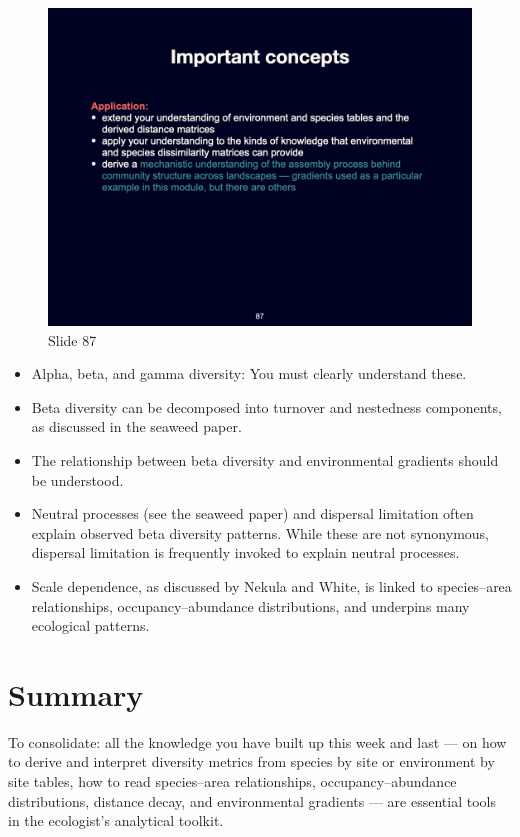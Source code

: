 \documentclass[
  12pt,
]{book}
\providecommand{\tightlist}{%
  \setlength{\itemsep}{0pt}\setlength{\parskip}{0pt}}
\begin{document}
\begin{figure}[ht]
\centering
\includegraphics[width=0.8\linewidth]{../images/BDC334/BDC334-087.jpeg}
\caption*{Slide 87}
\end{figure}

\begin{itemize}
\tightlist
\item
  Alpha, beta, and gamma diversity: You must clearly understand these.
\item
  Beta diversity can be decomposed into turnover and nestedness
  components, as discussed in the seaweed paper.
\item
  The relationship between beta diversity and environmental gradients
  should be understood.
\item
  Neutral processes (see the seaweed paper) and dispersal limitation
  often explain observed beta diversity patterns. While these are not
  synonymous, dispersal limitation is frequently invoked to explain
  neutral processes.
\item
  Scale dependence, as discussed by Nekula and White, is linked to
  species--area relationships, occupancy--abundance distributions, and
  underpins many ecological patterns.
\end{itemize}

\section{Summary}\label{summary}

To consolidate: all the knowledge you have built up this week and last
--- on how to derive and interpret diversity metrics from species by
site or environment by site tables, how to read species--area
relationships, occupancy--abundance distributions, distance decay, and
environmental gradients --- are essential tools in the ecologist's
analytical toolkit.
\end{document}
